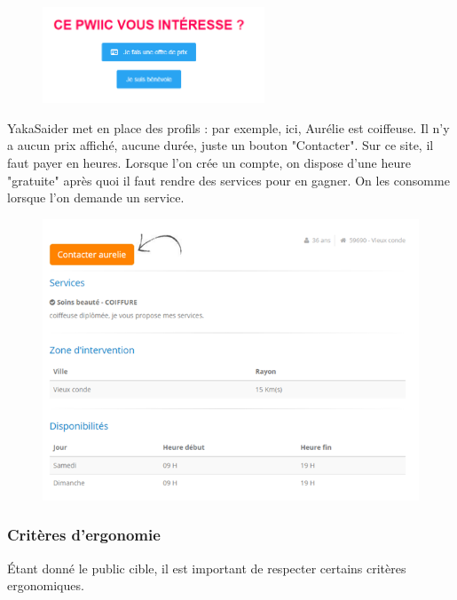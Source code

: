 \documentclass[a4paper,11pt]{article}
\begin{document}
\begin{figure}[H]
  \includegraphics[width=250px]{images/pieces-pwiic.png}
  \label{fig:pieces-pwiic}
\end{figure}

YakaSaider met en place des profils : par exemple, ici, Aurélie est coiffeuse. Il n’y a aucun prix affiché,
aucune durée, juste un bouton "Contacter". Sur ce site, il faut payer en heures. Lorsque l’on crée un compte,
on dispose d’une heure "gratuite" après quoi il faut rendre des services pour en gagner.
On les consomme lorsque l’on demande un service.\\

\begin{figure}[H]
  \includegraphics[width=500px]{images/aurelie-yakasaider.png}
  \label{fig:aurelie-yakasaider}
\end{figure}

\pagebreak

\subsubsection{Critères d'ergonomie}

Étant donné le public cible, il est important de respecter certains critères ergonomiques.\\
\end{document}

